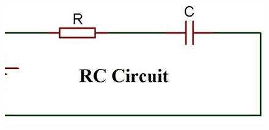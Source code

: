 \documentclass{beamer}
\begin{document}
    \begin{frame}{}
       
    \begin{figure}
        \centering
        \includegraphics[width=1\linewidth]{phys12-circuits-kirchhoffs-junction-rule.jpg}
    \end{figure}
\end{frame}
\end{document}
